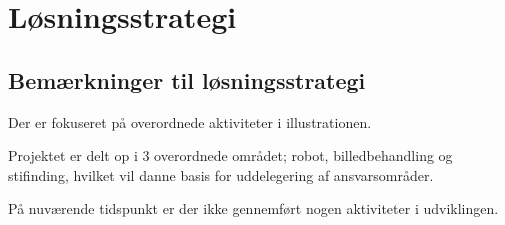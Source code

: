 \section{Løsningsstrategi}
\subsection{Bemærkninger til løsningsstrategi}
Der er fokuseret på overordnede aktiviteter i illustrationen.

Projektet er delt op i 3 overordnede området; robot, billedbehandling og stifinding, hvilket vil danne basis for uddelegering af ansvarsområder.

På nuværende tidspunkt er der ikke gennemført nogen aktiviteter i udviklingen.